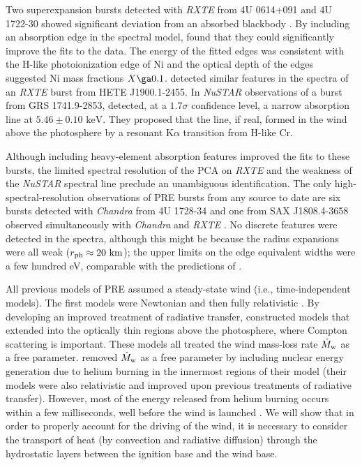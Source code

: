 \documentclass[apj,usenatbib, iop, twocolappendix]{emulateapj}
\newcommand{\Mdot}{\dot{M}_{\rm w}}
\newcommand{\trm}[1]{\textrm{#1}}
\begin{document}
Two superexpansion bursts detected with {\it RXTE} from 4U 0614+091 and 4U 1722-30 showed significant deviation from an absorbed blackbody . By including an absorption edge in the spectral model,  found that they could significantly improve the fits to the data.  The energy of the fitted edges was consistent with the H-like photoionization edge of Ni and the optical depth of the edges suggested Ni mass fractions $X\ga 0.1$.  \citet{Kajava:17} detected similar features in the spectra of an {\it RXTE} burst from HETE J1900.1-2455. In {\it NuSTAR} observations of a burst from GRS 1741.9-2853, \citet{Barriere:15} detected,  at a $1.7\sigma$ confidence level, a narrow absorption line at $5.46\pm 0.10\trm{ keV}$.  They proposed that the line, if real, formed in the wind above the photosphere by a resonant K$\alpha$ transition from H-like Cr.  

Although including heavy-element absorption features improved the fits to these bursts, the limited spectral resolution of the PCA on {\it RXTE} and the weakness of the {\it NuSTAR} spectral line preclude an unambiguous identification.   The only high-spectral-resolution observations of PRE bursts from any source to date are six bursts detected with {\it Chandra} from 4U 1728-34 \citep{Galloway:10}  and one from SAX J1808.4-3658 observed simultaneously with {\it Chandra} and {\it RXTE} \citep{intZand:13}.  No discrete features were detected in the spectra, although this might be because the radius expansions were all weak ($r_{\rm ph}\approx 20\trm{ km}$); the upper limits on the edge equivalent widths were a few hundred eV, comparable with the predictions of .
 
All previous models of PRE assumed a steady-state wind (i.e., time-independent models). The first models were Newtonian  \citep{Ebisuzaki:83, Kato:83, Quinn:85, Joss:87} and then fully relativistic \citep{Paczynski:86}. By developing an  improved treatment of radiative transfer, \citet{Joss:87} constructed models that extended into the optically thin regions above the photosphere, where Compton scattering is important.  These models all treated the wind mass-loss rate $\Mdot$ as a free parameter.  \citet{Nobili:94} removed $\Mdot$ as a free parameter by including nuclear energy generation due to helium burning in the innermost regions of their model (their models were also relativistic and improved upon previous treatments of radiative transfer). However, most of the energy released from helium burning occurs within a few milliseconds, well before the wind is launched . We will show that in order to properly account for the driving of the wind, it is necessary to consider the transport of heat (by convection and radiative diffusion) through the hydrostatic layers between the ignition base and the wind base.
\end{document}
